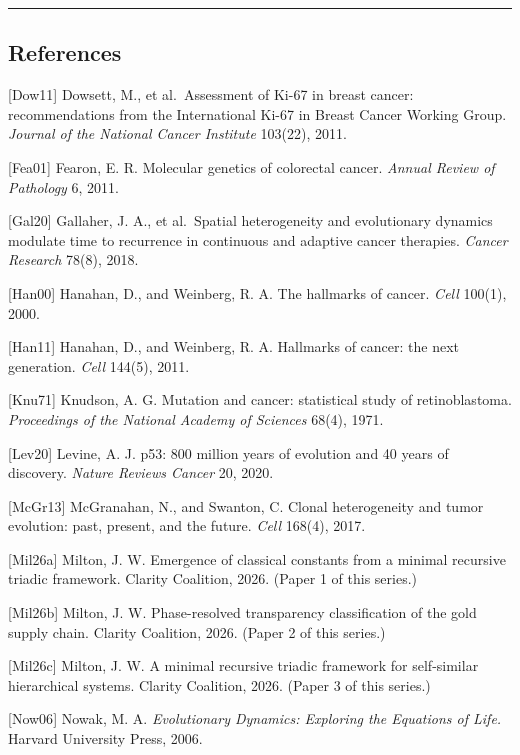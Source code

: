 \documentclass[
  11pt,
  letterpaper,
]{article}
\begin{document}
\begin{center}\rule{0.5\linewidth}{0.5pt}\end{center}

\subsection{References}\label{references}

{[}Dow11{]} Dowsett, M., et al.~Assessment of Ki-67 in breast cancer:
recommendations from the International Ki-67 in Breast Cancer Working
Group. \emph{Journal of the National Cancer Institute} 103(22), 2011.

{[}Fea01{]} Fearon, E. R. Molecular genetics of colorectal cancer.
\emph{Annual Review of Pathology} 6, 2011.

{[}Gal20{]} Gallaher, J. A., et al.~Spatial heterogeneity and
evolutionary dynamics modulate time to recurrence in continuous and
adaptive cancer therapies. \emph{Cancer Research} 78(8), 2018.

{[}Han00{]} Hanahan, D., and Weinberg, R. A. The hallmarks of cancer.
\emph{Cell} 100(1), 2000.

{[}Han11{]} Hanahan, D., and Weinberg, R. A. Hallmarks of cancer: the
next generation. \emph{Cell} 144(5), 2011.

{[}Knu71{]} Knudson, A. G. Mutation and cancer: statistical study of
retinoblastoma. \emph{Proceedings of the National Academy of Sciences}
68(4), 1971.

{[}Lev20{]} Levine, A. J. p53: 800 million years of evolution and 40
years of discovery. \emph{Nature Reviews Cancer} 20, 2020.

{[}McGr13{]} McGranahan, N., and Swanton, C. Clonal heterogeneity and
tumor evolution: past, present, and the future. \emph{Cell} 168(4),
2017.

{[}Mil26a{]} Milton, J. W. Emergence of classical constants from a
minimal recursive triadic framework. Clarity Coalition, 2026. (Paper 1
of this series.)

{[}Mil26b{]} Milton, J. W. Phase-resolved transparency classification of
the gold supply chain. Clarity Coalition, 2026. (Paper 2 of this
series.)

{[}Mil26c{]} Milton, J. W. A minimal recursive triadic framework for
self-similar hierarchical systems. Clarity Coalition, 2026. (Paper 3 of
this series.)

{[}Now06{]} Nowak, M. A. \emph{Evolutionary Dynamics: Exploring the
Equations of Life.} Harvard University Press, 2006.
\end{document}
